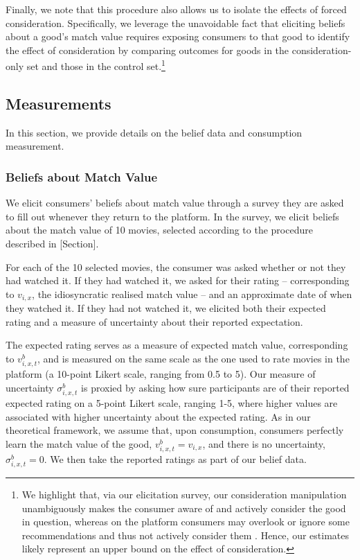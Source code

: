 \documentclass[12pt]{article}
\theoremstyle{newtheorem}
\begin{document}
Finally, we note that this procedure also allows us to isolate the effects of forced consideration. 
Specifically, we leverage the unavoidable fact that eliciting beliefs about a good's match value requires exposing consumers to that good to identify the effect of consideration by comparing outcomes for goods in the consideration-only set and those in the control set.\footnote{
    We highlight that, via our elicitation survey, our consideration manipulation unambiguously makes the consumer aware of and actively consider the good in question, whereas on the platform consumers may overlook or ignore some recommendations and thus not actively consider them  \citep{ZhaoChangHarperKonstan2016}. 
    Hence, our estimates likely represent an upper bound on the effect of consideration.
}




\subsection{Measurements}
\label{section:design:measurements}
In this section, we provide details on the belief data and consumption measurement.


\subsubsection{Beliefs about Match Value}
\label{section:design:measurements:beliefs}
We elicit consumers' beliefs about match value through a survey they are asked to fill out whenever they return to the platform. 
In the survey, we elicit beliefs about the match value of 10 movies, selected according to the procedure described in [Section]. 


For each of the 10 selected movies, the consumer was asked whether or not they had watched it. 
If they had watched it, we asked for their rating -- corresponding to $v_{i,x}$, the idiosyncratic realised match value -- and an approximate date of when they watched it. 
If they had not watched it, we elicited both their expected rating and a measure of uncertainty about their reported expectation. 


The expected rating serves as a measure of expected match value, corresponding to $v_{i,x,t}^b$, and is measured on the same scale as the one used to rate movies in the platform (a 10-point Likert scale, ranging from 0.5 to 5). 
Our measure of uncertainty $\sigma_{i,x,t}^b$ is proxied by asking how sure participants are of their reported expected rating on a 5-point Likert scale, ranging 1-5, where higher values are associated with higher uncertainty about the expected rating.
As in our theoretical framework, we assume that, upon consumption, consumers perfectly learn the match value of the good, $v_{i,x,t}^b=v_{i,x}$, and there is no uncertainty, $\sigma_{i,x,t}^b=0$. 
We then take the reported ratings as part of our belief data. 
\end{document}
